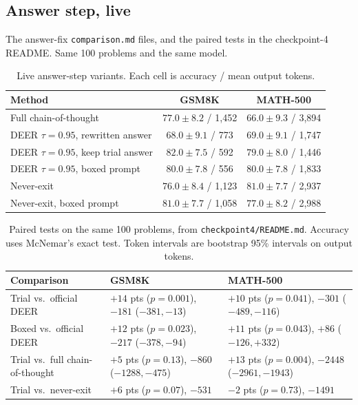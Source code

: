 \clearpage
\subsection{Answer step, live}
The answer-fix \texttt{comparison.md} files, and the paired tests in the checkpoint-4 README.
Same 100 problems and the same model.

\begin{table}[!t]
\caption{Live answer-step variants. Each cell is accuracy / mean output tokens.}
\label{tab:fix}
\centering
\scriptsize
\begin{tabular}{@{}lcc@{}}
\toprule
Method & GSM8K & MATH-500 \\
\midrule
Full chain-of-thought & $77.0\pm 8.2$ / 1{,}452 & $66.0\pm 9.3$ / 3{,}894 \\
DEER $\tau=0.95$, rewritten answer & $68.0\pm 9.1$ / 773 & $69.0\pm 9.1$ / 1{,}747 \\
DEER $\tau=0.95$, keep trial answer & $82.0\pm 7.5$ / 592 & $79.0\pm 8.0$ / 1{,}446 \\
DEER $\tau=0.95$, boxed prompt & $80.0\pm 7.8$ / 556 & $80.0\pm 7.8$ / 1{,}833 \\
Never-exit & $76.0\pm 8.4$ / 1{,}123 & $81.0\pm 7.7$ / 2{,}937 \\
Never-exit, boxed prompt & $81.0\pm 7.7$ / 1{,}058 & $77.0\pm 8.2$ / 2{,}988 \\
\bottomrule
\end{tabular}
\end{table}

\begin{table}[!t]
\caption{Paired tests on the same 100 problems, from \texttt{checkpoint4/README.md}. Accuracy uses McNemar's exact test. Token intervals are bootstrap 95\% intervals on output tokens.}
\label{tab:paired}
\centering
\scriptsize
\begin{tabular}{@{}lll@{}}
\toprule
Comparison & GSM8K & MATH-500 \\
\midrule
Trial vs.\ official DEER & $+14$ pts ($p=0.001$), $-181$ ($-381,-13$) & $+10$ pts ($p=0.041$), $-301$ ($-489,-116$) \\
Boxed vs.\ official DEER & $+12$ pts ($p=0.023$), $-217$ ($-378,-94$) & $+11$ pts ($p=0.043$), $+86$ ($-126,+332$) \\
Trial vs.\ full chain-of-thought & $+5$ pts ($p=0.13$), $-860$ ($-1288,-475$) & $+13$ pts ($p=0.004$), $-2448$ ($-2961,-1943$) \\
Trial vs.\ never-exit & $+6$ pts ($p=0.07$), $-531$ & $-2$ pts ($p=0.73$), $-1491$ \\
\bottomrule
\end{tabular}
\end{table}


